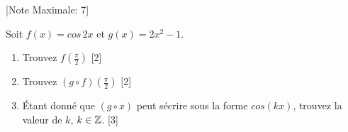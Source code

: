\begin{question}
  \hspace*{\fill} [Note Maximale: 7]\par
  \medskip
  \noindent Soit $f(x) = cos\,2x$ et $g(x) = 2x^2 - 1$.\par
  \medskip
  \begin{enumerate}[label=\alph*)]
    \item Trouvez $f\left(\frac{\pi}{2}\right)$\hspace*{\fill} [2]
    \item Trouvez $(g \circ f)\left(\frac{\pi}{2}\right)$\hspace*{\fill} [2]
    \item Étant donné que $(g \circ x)$ peut sécrire sous la forme $cos(kx)$, trouvez la valeur de $k$, $k \in \mathbb{Z}$.\hspace*{\fill} [3]
  \end{enumerate}
\end{question}
